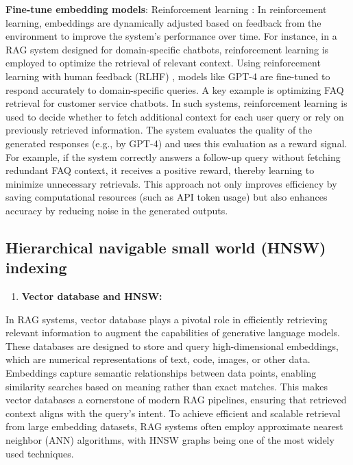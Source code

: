 \textbf{Fine-tune embedding models}: Reinforcement learning \cite{kulkarni2024rag}: In reinforcement learning, embeddings are dynamically adjusted based on feedback from the environment to improve the system's performance over time. For instance, in a RAG system designed for domain-specific chatbots, reinforcement learning is employed to optimize the retrieval of relevant context. Using reinforcement learning with human feedback (RLHF) \cite{kulkarni2024rag}, models like GPT-4 are fine-tuned to respond accurately to domain-specific queries. A key example is optimizing FAQ retrieval for customer service chatbots. In such systems, reinforcement learning is used to decide whether to fetch additional context for each user query or rely on previously retrieved information. The system evaluates the quality of the generated responses (e.g., by GPT-4) and uses this evaluation as a reward signal. For example, if the system correctly answers a follow-up query without fetching redundant FAQ context, it receives a positive reward, thereby learning to minimize unnecessary retrievals. This approach not only improves efficiency by saving computational resources (such as API token usage) but also enhances accuracy by reducing noise in the generated outputs.

\subsection{Hierarchical navigable small world (HNSW) indexing}
\begin{enumerate}
    \item \textbf{Vector database and HNSW:}
\end{enumerate}

In RAG systems, vector database plays a pivotal role in efficiently retrieving relevant information to augment the capabilities of generative language models. These databases are designed to store and query high-dimensional embeddings, which are numerical representations of text, code, images, or other data. Embeddings capture semantic relationships between data points, enabling similarity searches based on meaning rather than exact matches. This makes vector databases a cornerstone of modern RAG pipelines, ensuring that retrieved context aligns with the query’s intent. To achieve efficient and scalable retrieval from large embedding datasets, RAG systems often employ approximate nearest neighbor (ANN) algorithms, with HNSW graphs \cite{malkov2018hnsw} being one of the most widely used techniques.

